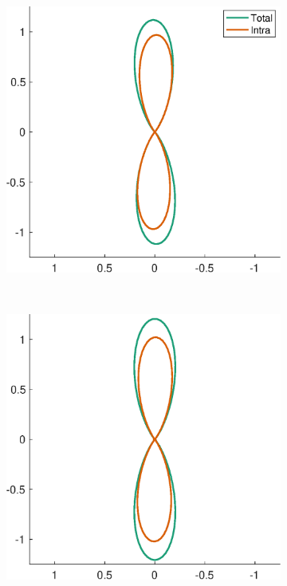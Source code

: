 \begin{figure}
  \centering
  \begin{subfigure}[]{0.4\textwidth}
    \includegraphics[width=\textwidth]{figures/frf_experiment/fod_inex_b3000_kappa2}
    \caption{}
  \end{subfigure}
  ~
  \begin{subfigure}[]{0.4\textwidth}
    \includegraphics[width=\textwidth]{figures/frf_experiment/fod_inex_b3000_kappa6}
    \caption{}
  \end{subfigure}


\end{figure}
